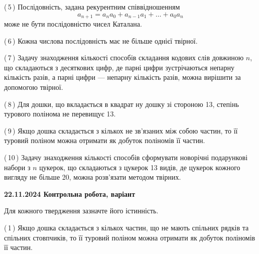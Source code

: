 \documentclass[12pt, ukrainian]{article}
\begin{document}
\begin {large}
\begin {large}
\begin {large}
\begin {large}
\begin {large}
\begin {large}
\begin {large}
\begin {large}
\begin {large}
\begin {large}
\begin {large}
\begin {large}
\begin {large}
\begin {large}
\begin {large}
\begin {large}
\begin {large}
\begin {large}
\begin {large}
\begin {large}
\begin {large}
\begin {large}
\begin {large}
\begin {large}
\begin {large}
\begin {large}
\begin {large}
\begin {large}
\begin {large}
\begin {large}
\begin {large}
\begin {large}
\begin {large}
\begin {large}
\begin {large}
{(\,5\,) Послідовність, задана рекурентним співвідношенням $$a_{n+1}=a_{n}a_{0}+a_{n-1}a_{1}+\ldots+a_0a_{n}$$ може не бути послідовністю чисел Каталана.%



(\,6\,) Кожна числова послідовність має не більше однієї твірної.%



(\,7\,) Задачу знаходження кількості способів складання кодових слів довжиною $n$, що складаються з десяткових цифр, де парні цифри зустрічаються непарну кількість разів, а парні цифри — непарну кількість разів, можна вирішити за допомогою твірної.%



(\,8\,) Для дошки, що вкладається в квадрат ну дошку зі стороною 13, степінь турового полінома не перевищує 13.%



(\,9\,) Якщо дошка складається з кількох не зв’язаних між собою частин, то її туровий поліном можна отримати як добуток поліномів її частин.%



(\,10\,) Задачу знаходження кількості способів сформувати новорічні подарункові набори з $n$ цукерок, що складаються з цукерок 13 видів, де цукерок кожного вигляду не більше 20, можна розв’язати методом твірних.%




\vspace{5mm}
}
\newpage

\begin {large}

\textbf{22.11.2024 Контрольна робота, варіант  }\par


{
Для кожного твердження зазначте його істинність.\par

\vspace{2mm}

(\,1\,) Якщо дошка складається з кількох частин, що не мають спільних рядків та спільних стовпчиків, то її туровий поліном можна отримати як добуток поліномів її частин.%



}
\end{large}
\end{large}
\end{large}
\end{large}
\end{large}
\end{large}
\end{large}
\end{large}
\end{large}
\end{large}
\end{large}
\end{large}
\end{large}
\end{large}
\end{large}
\end{large}
\end{large}
\end{large}
\end{large}
\end{large}
\end{large}
\end{large}
\end{large}
\end{large}
\end{large}
\end{large}
\end{large}
\end{large}
\end{large}
\end{large}
\end{large}
\end{large}
\end{large}
\end{large}
\end{large}
\end{large}
\end{document}
